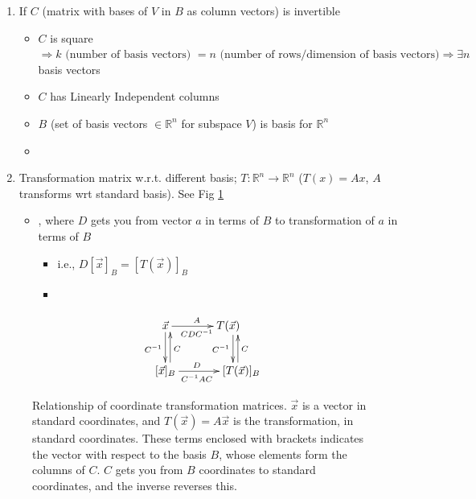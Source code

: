 \documentclass[10pt,letterpaper]{article}
\begin{document}
\begin{enumerate}
\item If $C$ (matrix with bases of $V$ in $B$ as column vectors) is invertible

\begin{itemize}
\item $C$ is square $\Rightarrow k \text{ (number of basis vectors) }=n \text{ (number of rows/dimension of basis vectors)} \Rightarrow \exists n$ basis vectors
\item $C$ has Linearly Independent columns
\item $B$ (set of basis vectors $\in \mathbb{R}^{n}$  for subspace $V$) is basis for $\mathbb{R}^{n}$
\item {}
\end{itemize}

\item Transformation matrix w.r.t. different basis; $T:\mathbb{R}^{n} \rightarrow \mathbb{R}^{n}$ ($T(x)= Ax$, $A$ transforms wrt standard basis). See Fig \ref{fig:transformation}

\begin{itemize}
\item {}, where $D$ gets you from vector $a$ in terms of $B$ to transformation of $a$ in terms of $B$

\begin{itemize}
\item i.e., $D[ \vec{x} ]_B = [T( \vec{x})]_B$
\item {}
\end{itemize}

\end{itemize}

\end{enumerate}
  \begin{figure}
  \begin{displaymath}
  \xymatrix{ \vec{x} \ar[r]^{A}_{CDC ^{-1} } \ar[d] _{C ^{-1} }
  & T(\vec{x}) \ar@<1ex>[d]_{C ^{-1} }  \\
  [\vec{x}]_B \ar@<-1ex>[u] _{C}  \ar[r]_{C ^{-1} AC}^{D}
  & *+[r]{[T( \vec{x} )]_B} \ar@<-2ex>[u]_{C}}
  \end{displaymath}
  \caption{Relationship of coordinate transformation matrices. $\vec{x}$ is a vector in standard coordinates, and $T( \vec{x} )=A \vec{x}$ is the transformation, in standard coordinates. These terms enclosed with brackets indicates the vector with respect to the basis $B$, whose elements form the columns of $C$. $C$ gets you from $B$ coordinates to standard coordinates, and the inverse reverses this.}
  \label{fig:transformation}
  \end{figure}
\end{document}
